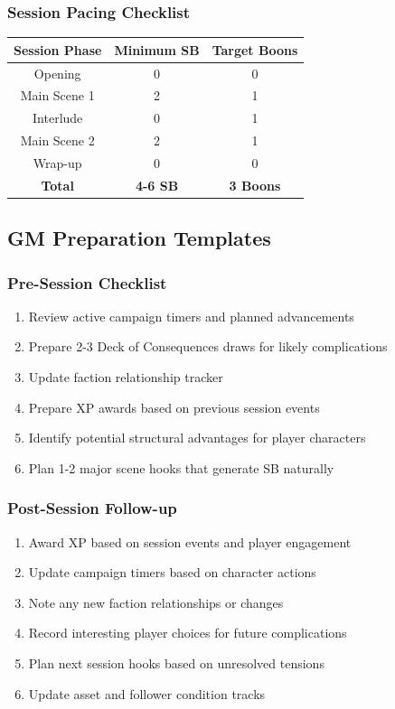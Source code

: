 \documentclass[11pt,letterpaper]{article}
\begin{document}
\subsubsection{Session Pacing Checklist}

\begin{center}
\begin{tabular}{|c|c|c|}
\hline
\textbf{Session Phase} & \textbf{Minimum SB} & \textbf{Target Boons} \\
\hline
Opening & 0 & 0 \\
\hline
Main Scene 1 & 2 & 1 \\
\hline
Interlude & 0 & 1 \\
\hline
Main Scene 2 & 2 & 1 \\
\hline
Wrap-up & 0 & 0 \\
\hline
\textbf{Total} & \textbf{4-6 SB} & \textbf{3 Boons} \\
\hline
\end{tabular}
\end{center}

\subsection{GM Preparation Templates}

\subsubsection{Pre-Session Checklist}

\begin{enumerate}
    \item Review active campaign timers and planned advancements
    \item Prepare 2-3 Deck of Consequences draws for likely complications
    \item Update faction relationship tracker
    \item Prepare XP awards based on previous session events
    \item Identify potential structural advantages for player characters
    \item Plan 1-2 major scene hooks that generate SB naturally
\end{enumerate}

\subsubsection{Post-Session Follow-up}

\begin{enumerate}
    \item Award XP based on session events and player engagement
    \item Update campaign timers based on character actions
    \item Note any new faction relationships or changes
    \item Record interesting player choices for future complications
    \item Plan next session hooks based on unresolved tensions
    \item Update asset and follower condition tracks
\end{enumerate}
\end{document}
